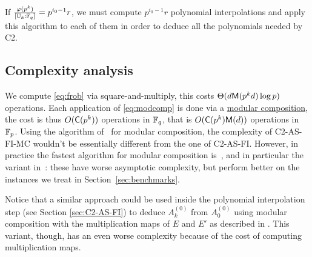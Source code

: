 If $\frac{\varphi(p^k)}{[\mathbb{U}_k:\mathbb{F}_q]} = p^{i_0-1}r$, we must compute
$p^{i_0-1}r$ polynomial interpolations and apply this algorithm to
each of them in order to deduce all the polynomials needed by C2.


\subsection{Complexity analysis}
We compute \eqref{eq:frob} via square-and-multiply, this costs
$\Theta(d\mathsf{M}(p^kd)\log p)$ operations. Each application of
\eqref{eq:modcomp} is done via a
\hyperref[sec:modular-composition]{modular composition}, the cost is
thus $O(\mathsf{C}(p^k))$ operations in $\mathbb{F}_q$, that is
$O(\mathsf{C}(p^k)\mathsf{M}(d))$ operations in $\mathbb{F}_p$. Using the algorithm
of~\cite{kedlaya+umans08} for modular composition, the complexity of
C2-AS-FI-MC wouldn't be essentially different from the one of
C2-AS-FI. However, in practice the fastest algorithm for modular
composition is~\cite{brent+kung}, and in particular the variant
in~\cite[Lemma~3]{kaltofen+shoup98}: these have worse asymptotic
complexity, but perform better on the instances we treat in
Section~\ref{sec:benchmarks}.

Notice that a similar approach could be used inside the polynomial
interpolation step (see Section \ref{sec:C2-AS-FI}) to deduce
$A_k^{(0)}$ from $A_0^{(0)}$ using modular composition with the
multiplication maps of $E$ and $E'$ as described in
\cite[$\S$2.3]{couveignes96}. This variant, though, has an even worse
complexity because of the cost of computing multiplication maps.




%
